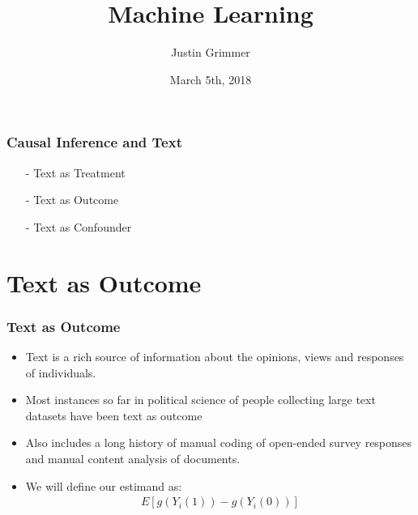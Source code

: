 \documentclass[xcolor=dvipsnames]{beamer}
\title[Machine Learning]{Machine Learning}
\author[Justin Grimmer]{Justin Grimmer}
\institute[University of Chicago]{University of Chicago}
\date{March 5th, 2018}
\begin{document}
\frame{\titlepage}


\begin{frame}
\frametitle{Causal Inference and Text}

\huge

\begin{itemize}
\item[-] Text as Treatment
\item[-] Text as Outcome
\item[-] Text as Confounder
\end{itemize}	


\end{frame}




\section{Text as Outcome}

\begin{frame}
\frametitle{Text as Outcome}
\begin{center}
\end{center}

\begin{itemize}
\item<1-> Text is a rich source of information about the opinions, views and responses of individuals.
\item<5-> Most instances so far in political science of people collecting large text datasets have been text as \alert{outcome}
\item<6-> Also includes a long history of manual coding of open-ended survey responses and manual content analysis of documents.
\item<7-> We will define our estimand as:
\begin{align*}
E[g(Y_i(1)) - g(Y_i(0))]
\end{align*}
\end{itemize}
\end{frame}
\end{document}
